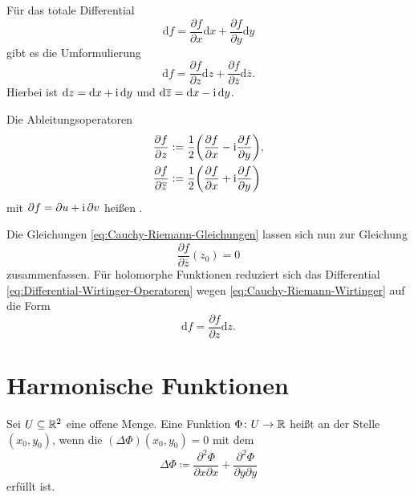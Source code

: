 Für das totale Differential
\begin{equation}
\mathrm df = \frac{\partial f}{\partial x}\mathrm dx+\frac{\partial f}{\partial y}\mathrm dy
\end{equation}
gibt es die Umformulierung
\begin{equation}\label{eq:Differential-Wirtinger-Operatoren}
\mathrm df = \frac{\partial f}{\partial z}\mathrm dz+\frac{\partial f}{\partial\overline z}\mathrm d\overline z.
\end{equation}
Hierbei ist $\mathrm dz=\mathrm dx+\mathrm i\,\mathrm dy$ und $\mathrm d\overline{z}=\mathrm dx-\mathrm i\,\mathrm dy$.

Die Ableitungsoperatoren
\begin{align}
\frac{\partial f}{\partial z}
&:=\frac{1}{2}\bigg(\frac{\partial f}{\partial x}-\mathrm i\frac{\partial f}{\partial y}\bigg),\\
\frac{\partial f}{\partial\overline z}
&:=\frac{1}{2}\bigg(\frac{\partial f}{\partial x}+\mathrm i\frac{\partial f}{\partial y}\bigg)
\end{align}
mit $\partial f=\partial u+\mathrm i\,\partial v$ heißen .

Die Gleichungen \eqref{eq:Cauchy-Riemann-Gleichungen} lassen sich nun
zur Gleichung%
\begin{equation}\label{eq:Cauchy-Riemann-Wirtinger}
\frac{\partial f}{\partial\overline z}(z_0)=0
\end{equation}
zusammenfassen. Für holomorphe Funktionen reduziert sich das
Differential \eqref{eq:Differential-Wirtinger-Operatoren} wegen
\eqref{eq:Cauchy-Riemann-Wirtinger} auf die Form%
\begin{equation}
\mathrm df = \frac{\partial f}{\partial z}\mathrm dz.
\end{equation}

\section{Harmonische Funktionen}
\begin{definition}\mbox{}\newline
Sei $U\subseteq\mathbb R^2$ eine offene Menge.
Eine Funktion $\Phi\colon U\to\mathbb R$ heißt 
an der Stelle $(x_0,y_0)$, wenn die 
$(\Delta\Phi)(x_0,y_0)=0$ mit dem %
\begin{equation}
\Delta\Phi\coloneq
\frac{\partial^2\Phi}{\partial x\partial x}+
\frac{\partial^2\Phi}{\partial y\partial y}
\end{equation}
erfüllt ist.
\end{definition}

